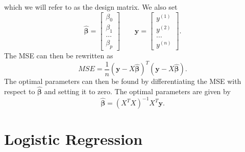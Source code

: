 which we will refer to as the design matrix.
We also set 
$$ \hat{\boldsymbol{\beta}} =
\begin{bmatrix}
    \beta_0 \\
    \beta_1 \\
    \hdots \\
    \beta_p
\end{bmatrix} \qquad \boldsymbol{y} =
\begin{bmatrix}
    y^{(1)} \\
    y^{(2)} \\
    \hdots \\
    y^{(n)}
\end{bmatrix}.
$$
The MSE can then be rewritten as
\begin{equation*}
    MSE = \frac{1}{n}(\boldsymbol{y} - X\hat{\boldsymbol{\beta}})^T(\boldsymbol{y} - X\hat{\boldsymbol{\beta}}).
\end{equation*}
The optimal parameters can then be found by differentiating the MSE with respect to $\hat{\boldsymbol{\beta}}$ and setting it to zero. The optimal parameters are given by \cite{handsonml}
\begin{equation}
    \label{eq:LinearRegressionBeta}
    \hat{\boldsymbol{\beta}} = (X^TX)^{-1}X^T\boldsymbol{y}.
\end{equation}

\section{Logistic Regression}
\label{sec:SupLearLogReg}

